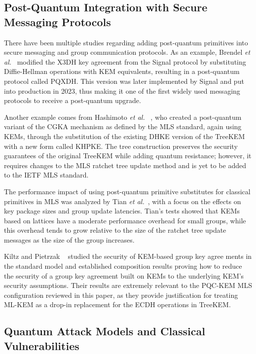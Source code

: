 \documentclass{ieeeaccess}
\begin{document}
\subsection{Post-Quantum Integration with Secure Messaging Protocols}

There have been multiple studies regarding adding post-quantum primitives into secure messaging and group communication protocols. As an example, Brendel \emph{et al.}~\cite{brendel2020} modified the X3DH key agreement from the Signal protocol by substituting Diffie-Hellman operations with KEM equivalents, resulting in a post-quantum protocol called PQXDH. This version was later implemented by Signal and put into production in 2023, thus making it one of the first widely used messaging protocols to receive a post-quantum upgrade.

Another example comes from Hashimoto \emph{et al.}~\cite{hashimoto2021} , who created a post-quantum variant of the CGKA mechanism as defined by the MLS standard, again using KEMs, through the substitution of the existing DHKE version of the TreeKEM with a new form called KHPKE. The tree construction preserves the security guarantees of the original TreeKEM while adding quantum resistance; however, it requires changes to the MLS ratchet tree update method and is yet to be added to the IETF MLS standard.

The performance impact of using post-quantum primitive substitutes for classical primitives in MLS was analyzed by Tian \emph{et al.}~\cite{tian2022}, with a focus on the effects on key package sizes and group update latencies. Tian's tests showed that KEMs based on lattices have a moderate performance overhead for small groups, while this overhead tends to grow relative to the size of the ratchet tree update messages as the size of the group increases.

Kiltz and Pietrzak ~\cite{kiltz2018} studied the security of KEM-based group key agree ments in the standard model and established composition results proving how to reduce the security of a group key agreement built on KEMs to the underlying KEM's security assumptions. Their results are extremely relevant to the PQC-KEM MLS configuration reviewed in this paper, as they provide justification for treating ML-KEM as a drop-in replacement for the ECDH operations in TreeKEM.

\subsection{Quantum Attack Models and Classical Vulnerabilities}
\end{document}
